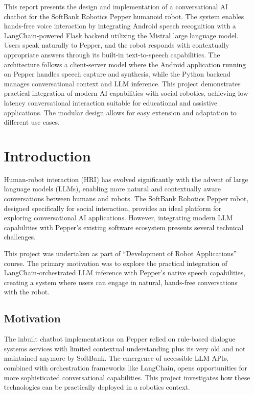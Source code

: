 \documentclass[a4paper]{article}
\begin{document}
This report presents the design and implementation of a conversational AI chatbot for the SoftBank Robotics Pepper humanoid robot. The system enables hands-free voice interaction by integrating Android speech recognition with a LangChain-powered Flask backend utilizing the Mistral large language model. Users speak naturally to Pepper, and the robot responds with contextually appropriate answers through its built-in text-to-speech capabilities. The architecture follows a client-server model where the Android application running on Pepper handles speech capture and synthesis, while the Python backend manages conversational context and LLM inference. This project demonstrates practical integration of modern AI capabilities with social robotics, achieving low-latency conversational interaction suitable for educational and assistive applications. The modular design allows for easy extension and adaptation to different use cases.

\newpage
\tableofcontents
\newpage

\section{Introduction}

Human-robot interaction (HRI) has evolved significantly with the advent of large language models (LLMs), enabling more natural and contextually aware conversations between humans and robots. The SoftBank Robotics Pepper robot, designed specifically for social interaction, provides an ideal platform for exploring conversational AI applications. However, integrating modern LLM capabilities with Pepper's existing software ecosystem presents several technical challenges.

This project was undertaken as part of ``Development of Robot Applications'' course. The primary motivation was to explore the practical integration of LangChain-orchestrated LLM inference with Pepper's native speech capabilities, creating a system where users can engage in natural, hands-free conversations with the robot.

\subsection{Motivation}

The inbuilt chatbot implementations on Pepper relied on rule-based dialogue systems services with limited contextual understanding plus its very old and not maintained anymore by SoftBank. The emergence of accessible LLM APIs, combined with orchestration frameworks like LangChain, opens opportunities for more sophisticated conversational capabilities. This project investigates how these technologies can be practically deployed in a robotics context.
\end{document}
